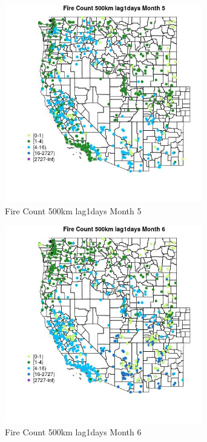\begin{figure} 
\centering  
\includegraphics[width=0.77\textwidth]{Code_Outputs/Report_ML_input_PM25_Step4_part_f_de_duplicated_aves_prioritize_24hr_obswNAs_MapObsMo5Fire_Count_500km_lag1days.jpg} 
\caption{\label{fig:Report_ML_input_PM25_Step4_part_f_de_duplicated_aves_prioritize_24hr_obswNAsMapObsMo5Fire_Count_500km_lag1days}Fire Count 500km lag1days Month 5} 
\end{figure} 
 

\begin{figure} 
\centering  
\includegraphics[width=0.77\textwidth]{Code_Outputs/Report_ML_input_PM25_Step4_part_f_de_duplicated_aves_prioritize_24hr_obswNAs_MapObsMo6Fire_Count_500km_lag1days.jpg} 
\caption{\label{fig:Report_ML_input_PM25_Step4_part_f_de_duplicated_aves_prioritize_24hr_obswNAsMapObsMo6Fire_Count_500km_lag1days}Fire Count 500km lag1days Month 6} 
\end{figure} 
 

